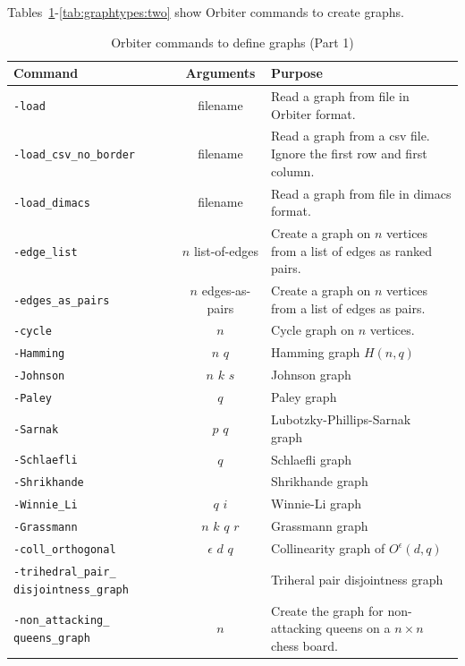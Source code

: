 Tables~\ref{tab:graphtypes:one}-\ref{tab:graphtypes:two} show Orbiter commands to create graphs.
\begin{table}
\begin{center}
\begin{tabular}{|p{4cm}|c|p{7cm}|}
\hline
Command & Arguments & Purpose \\
\hline
\hline
\verb'-load' & filename  & Read a graph from file in Orbiter format. \\
\hline
\verb'-load_csv_no_border' & filename  & Read a graph from a csv file. Ignore the first row and first column. \\
\hline
\verb'-load_dimacs' & filename  & Read a graph from file in dimacs format. \\
\hline
\verb'-edge_list' & $n$ list-of-edges  & Create a graph on $n$ vertices from a list of edges as ranked pairs. \\
\hline
\verb'-edges_as_pairs' & $n$ edges-as-pairs  & Create a graph on $n$ vertices from a list of edges as pairs. \\
\hline
\verb'-cycle' & $n$   & Cycle graph on $n$ vertices. \\
\hline
\verb'-Hamming' & $n$ $q$  & Hamming graph $H(n,q)$ \\
\hline
\verb'-Johnson' & $n$ $k$ $s$  & Johnson graph \\
\hline
\verb'-Paley' & $q$  & Paley graph \\
\hline
\verb'-Sarnak' & $p$ $q$  & Lubotzky-Phillips-Sarnak graph~\cite{Lubotzky1988} \\
\hline
\verb'-Schlaefli' & $q$  & Schlaefli graph \\
\hline
\verb'-Shrikhande' &   & Shrikhande graph \\
\hline
\verb'-Winnie_Li' & $q$ $i$  & Winnie-Li graph~\cite{Li1992} \\
\hline
\verb'-Grassmann' & $n$ $k$ $q$ $r$  & Grassmann graph \\
\hline
\verb'-coll_orthogonal' & $\epsilon$ $d$ $q$   & Collinearity graph of $O^\epsilon(d,q)$\\
\hline
\verb'-trihedral_pair_' \verb'disjointness_graph' &    & Triheral pair disjointness graph\\
\hline
\verb'-non_attacking_' \verb'queens_graph' &  $n$  & Create the graph for non-attacking queens 
on a $n \times n$ chess board. \\
\hline
\end{tabular}
\end{center}
\caption{\label{tab:graphtypes:one}Orbiter commands to define graphs (Part 1)}
\end{table}
